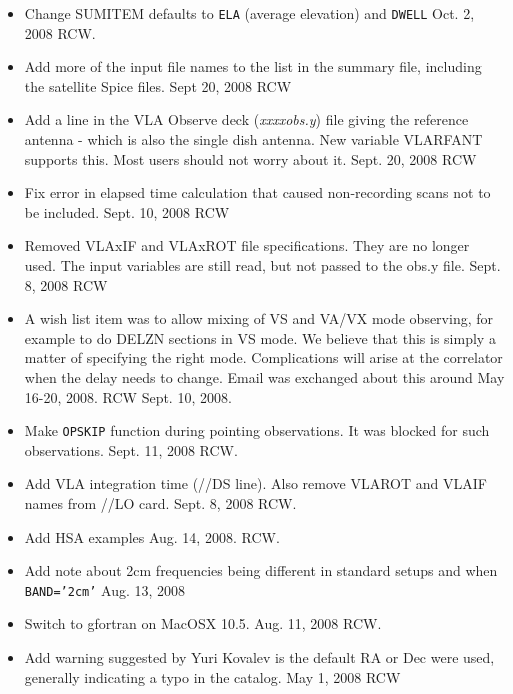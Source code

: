 \documentclass{report}
\begin{document}
\begin{itemize}
\item  Change SUMITEM defaults to {\tt ELA} (average elevation) and
       {\tt DWELL}  Oct. 2, 2008  RCW.

\item  Add more of the input file names to the list in the summary file,
       including the satellite Spice files.  Sept 20, 2008  RCW

\item  Add a line in the VLA Observe deck ({\sl xxxxobs.y}) file giving
       the reference antenna - which is also the single dish antenna.
       New variable VLARFANT supports this.  Most users should not
       worry about it.  Sept. 20, 2008  RCW

\item  Fix error in elapsed time calculation that caused non-recording
       scans not to be included.  Sept. 10, 2008  RCW

\item  Removed VLAxIF and VLAxROT file specifications.  They are no longer
       used.  The input variables are still read, but not passed to the
       obs.y file.  Sept. 8, 2008 RCW

\item  A wish list item was to allow mixing of VS and VA/VX mode observing,
       for example to do DELZN sections in VS mode.  We believe that this
       is simply a matter of specifying the right mode.  Complications
       will arise at the correlator when the delay needs to change.  Email
       was exchanged about this around May 16-20, 2008.
       RCW  Sept. 10, 2008.

\item  Make {\tt OPSKIP} function during pointing observations.  It was
       blocked for such observations.  Sept. 11, 2008  RCW.

\item  Add VLA integration time (//DS line).  Also remove VLAROT and
       VLAIF names from //LO card.  Sept. 8, 2008  RCW.

\item  Add HSA examples  Aug. 14, 2008.  RCW.

\item  Add note about 2cm frequencies being different in standard
       setups and when {\tt BAND='2cm'}  Aug. 13, 2008

\item  Switch to gfortran on MacOSX 10.5.  Aug. 11, 2008  RCW.

\item  Add warning suggested by Yuri Kovalev is the default RA or Dec
       were used, generally indicating a typo in the catalog.  May 1, 2008 RCW


\end{itemize}
\end{document}
